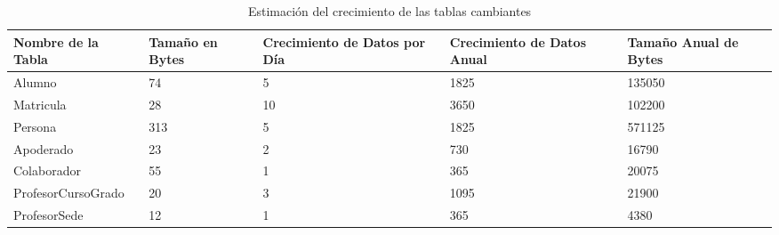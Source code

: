 \begin{table}[H]
	\centering
	\renewcommand{\arraystretch}{1.5}
	\begin{tabular}{|p{3cm}|p{2cm}|p{2cm}|p{2.5cm}|p{2.5cm}|}
		\hline
		\textbf{Nombre de la Tabla} & \textbf{Tamaño en Bytes} & \textbf{Crecimiento de Datos por Día} & \textbf{Crecimiento de Datos Anual} & \textbf{Tamaño Anual de Bytes} \\
		\hline
		Alumno                      & 74                       & 5                                     & 1825                                & 135050                         \\
		\hline
		Matricula                   & 28                       & 10                                    & 3650                                & 102200                         \\
		\hline
		Persona                     & 313                      & 5                                     & 1825                                & 571125                         \\
		\hline
		Apoderado                   & 23                       & 2                                     & 730                                 & 16790                          \\
		\hline
		Colaborador                 & 55                       & 1                                     & 365                                 & 20075                          \\
		\hline
		ProfesorCursoGrado          & 20                       & 3                                     & 1095                                & 21900                          \\
		\hline
		ProfesorSede                & 12                       & 1                                     & 365                                 & 4380                           \\
		\hline
	\end{tabular}
	\caption{Estimación del crecimiento de las tablas cambiantes}
\end{table}